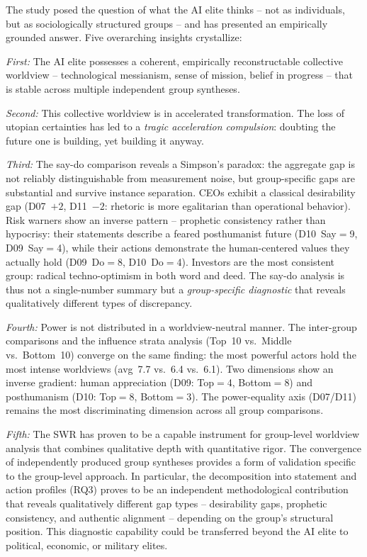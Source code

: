 \documentclass[12pt,a4paper]{article}
\begin{document}
The study posed the question of what the AI elite thinks -- not as individuals, but as sociologically structured groups -- and has presented an empirically grounded answer. Five overarching insights crystallize:

\emph{First:} The AI elite possesses a coherent, empirically reconstructable collective worldview -- technological messianism, sense of mission, belief in progress -- that is stable across multiple independent group syntheses.

\emph{Second:} This collective worldview is in accelerated transformation. The loss of utopian certainties has led to a \emph{tragic acceleration compulsion}: doubting the future one is building, yet building it anyway.

\emph{Third:} The say-do comparison reveals a Simpson's paradox: the aggregate gap is not reliably distinguishable from measurement noise, but group-specific gaps are substantial and survive instance separation. CEOs exhibit a classical desirability gap (D07~$+2$, D11~$-2$: rhetoric is more egalitarian than operational behavior). Risk warners show an inverse pattern -- prophetic consistency rather than hypocrisy: their statements describe a feared posthumanist future (D10~Say$=$9, D09~Say$=$4), while their actions demonstrate the human-centered values they actually hold (D09~Do$=$8, D10~Do$=$4). Investors are the most consistent group: radical techno-optimism in both word and deed. The say-do analysis is thus not a single-number summary but a \emph{group-specific diagnostic} that reveals qualitatively different types of discrepancy.

\emph{Fourth:} Power is not distributed in a worldview-neutral manner. The inter-group comparisons and the influence strata analysis (Top~10 vs.\ Middle vs.\ Bottom~10) converge on the same finding: the most powerful actors hold the most intense worldviews (avg~7.7 vs.\ 6.4 vs.\ 6.1). Two dimensions show an inverse gradient: human appreciation (D09: Top$=$4, Bottom$=$8) and posthumanism (D10: Top$=$8, Bottom$=$3). The power-equality axis (D07/D11) remains the most discriminating dimension across all group comparisons.

\emph{Fifth:} The SWR has proven to be a capable instrument for group-level worldview analysis that combines qualitative depth with quantitative rigor. The convergence of independently produced group syntheses provides a form of validation specific to the group-level approach. In particular, the decomposition into statement and action profiles (RQ3) proves to be an independent methodological contribution that reveals qualitatively different gap types -- desirability gaps, prophetic consistency, and authentic alignment -- depending on the group's structural position. This diagnostic capability could be transferred beyond the AI elite to political, economic, or military elites.
\end{document}
